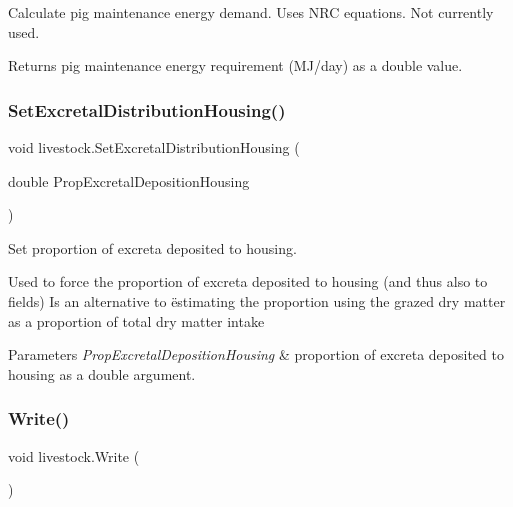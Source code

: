 Calculate pig maintenance energy demand. Uses N\+RC equations. Not currently used. 

\begin{DoxyReturn}{Returns}
pig maintenance energy requirement (M\+J/day) as a double value. 
\end{DoxyReturn}
\mbox{\label{classlivestock_aae778774f618bd97cf190c55e8ad179f}} 
\subsubsection{\texorpdfstring{SetExcretalDistributionHousing()}{SetExcretalDistributionHousing()}}
{\footnotesize\ttfamily void livestock.\+Set\+Excretal\+Distribution\+Housing (\begin{DoxyParamCaption}\item[{double}]{Prop\+Excretal\+Deposition\+Housing }\end{DoxyParamCaption})\hspace{0.3cm}{\ttfamily [inline]}}



Set proportion of excreta deposited to housing. 

Used to force the proportion of excreta deposited to housing (and thus also to fields) Is an alternative to ëstimating the proportion using the grazed dry matter as a proportion of total dry matter intake 
\begin{DoxyParams}{Parameters}
{\em Prop\+Excretal\+Deposition\+Housing} & proportion of excreta deposited to housing as a double argument. \\
\hline
\end{DoxyParams}
\mbox{\label{classlivestock_a3f2eb801302c373964c9c4b665b15cf4}} 
\subsubsection{\texorpdfstring{Write()}{Write()}}
{\footnotesize\ttfamily void livestock.\+Write (\begin{DoxyParamCaption}{ }\end{DoxyParamCaption})\hspace{0.3cm}{\ttfamily [inline]}}



